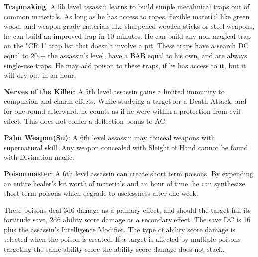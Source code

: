 \textbf{Trapmaking}: A 5h level assassin learns to build simple mecahnical traps out of common materials. As long as he has access to ropes, flexible material like green wood, and weapon-grade materials like sharpened wooden sticks or steel weapons, he can build an improved trap in 10 minutes. He can build any non-magical trap on the "CR 1" trap list that doesn't involve a pit. These traps have a search DC equal to 20 + the assassin's level, have a BAB equal to his own, and are always single-use traps. He may add poison to these traps, if he has access to it, but it will dry out in an hour.

\textbf{Nerves of the Killer}:  A 5th level assassin gains a limited immunity to compulsion and charm effects. While studying a target for a Death Attack, and for one round afterward, he counts as if he were within a protection from evil effect. This does not confer a deflection bonus to AC.

\textbf{Palm Weapon(Su)}: A 6th level assassin may conceal weapons with supernatural skill. Any weapon concealed with Sleight of Hand cannot be found with Divination magic.

\textbf{Poisonmaster}: A 6th level assassin can create short term poisons. By expending an entire healer's kit worth of materials and an hour of time, he can synthesize short term poisons which degrade to uselessness after one week.

These poisons deal 3d6 damage as a primary effect, and should the target fail its fortitude save, 2d6 ability score damage as a secondary effect. The save DC is 16 plus the assassin's Intelligence Modifier. The type of ability score damage is selected when the poison is created. If a target is affected by multiple poisons targeting the same ability score the ability score damage does not stack.

